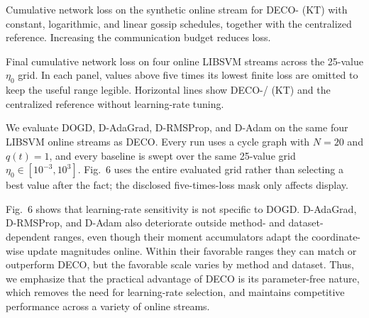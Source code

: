 \documentclass[12pt,english]{reviewresponse}
\newcommand{\algname}{{DECO}\xspace}
\begin{document}
\begin{revresponse}
\begin{changes}
        Cumulative network loss on the synthetic online stream for \algname{}- (KT) with constant, logarithmic, and linear gossip schedules, together with the centralized reference. Increasing the communication budget reduces loss.

        Final cumulative network loss on four online LIBSVM streams across the 25-value $\eta_0$ grid. In each panel, values above five times its lowest finite loss are omitted to keep the useful range legible. Horizontal lines show \algname{}-/ (KT) and the centralized reference without learning-rate tuning.

        We evaluate DOGD, D-AdaGrad, D-RMSProp, and D-Adam on the same four LIBSVM online streams as \algname{}.
        Every run uses a cycle graph with $N=20$ and $q(t)=1$, and every baseline is swept over the same 25-value grid $\eta_0\in[10^{-3},10^3]$.
        Fig.~6 uses the entire evaluated grid rather than selecting a best value after the fact; the disclosed five-times-loss mask only affects display.

        Fig.~6 shows that learning-rate sensitivity is not specific to DOGD\@.
        D-AdaGrad, D-RMSProp, and D-Adam also deteriorate outside method- and dataset-dependent ranges, even though their moment accumulators adapt the coordinate-wise update magnitudes online.
        Within their favorable ranges they can match or outperform \algname{}, but the favorable scale varies by method and dataset.
        Thus, we emphasize that the practical advantage of \algname{} is its parameter-free nature, which removes the need for learning-rate selection, and maintains competitive performance across a variety of online streams.


\end{changes}
\end{revresponse}
\end{document}
